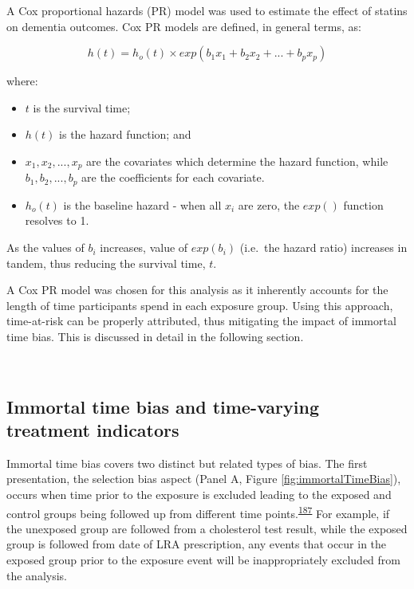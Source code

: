 \documentclass[a4paper, twoside]{templates/ociamthesis}
\providecommand{\tightlist}{%
  \setlength{\itemsep}{0pt}\setlength{\parskip}{0pt}}
\begin{document}
A Cox proportional hazards (PR) model was used to estimate the effect of statins on dementia outcomes. Cox PR models are defined, in general terms, as:

\begin{equation}
  h(t) = h_o(t) \times exp(b_1x_1 + b_2x_2 + ... +b_px_p)
  \label{eq:cox-model}
\end{equation}

where:

\begin{itemize}
\tightlist
\item
  \(t\) is the survival time;
\item
  \(h(t)\) is the hazard function; and
\item
  \(x_1,x_2,...,x_p\) are the covariates which determine the hazard function, while \(b_1,b_2,...,b_p\) are the coefficients for each covariate.
\item
  \(h_o(t)\) is the baseline hazard - when all \(x_i\) are zero, the \(exp()\) function resolves to 1.
\end{itemize}

As the values of \(b_i\) increases, value of \(exp(b_i)\) (i.e.~the hazard ratio) increases in tandem, thus reducing the survival time, \(t\).

A Cox PR model was chosen for this analysis as it inherently accounts for the length of time participants spend in each exposure group. Using this approach, time-at-risk can be properly attributed, thus mitigating the impact of immortal time bias. This is discussed in detail in the following section.

~

\hypertarget{cprd-immortal-time-bias}{%
\subsection{Immortal time bias and time-varying treatment indicators}\label{cprd-immortal-time-bias}}

Immortal time bias covers two distinct but related types of bias. The first presentation, the selection bias aspect (Panel A, Figure \ref{fig:immortalTimeBias}), occurs when time prior to the exposure is excluded leading to the exposed and control groups being followed up from different time points.\textsuperscript{\protect\hyperlink{ref-levesque2010}{187}} For example, if the unexposed group are followed from a cholesterol test result, while the exposed group is followed from date of LRA prescription, any events that occur in the exposed group prior to the exposure event will be inappropriately excluded from the analysis.
\end{document}
